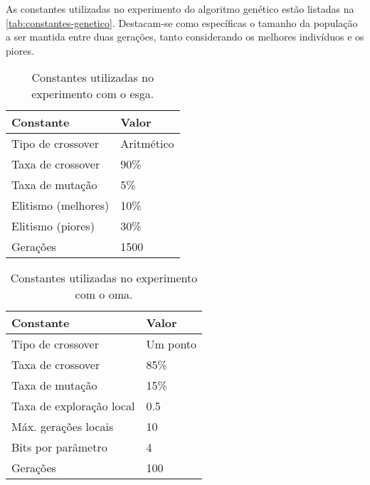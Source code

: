 As constantes utilizadas no experimento do algoritmo genético estão listadas na \autoref{tab:constantes-genetico}.
Destacam-se como específicas o tamanho da população a ser mantida entre duas gerações, tanto considerando os melhores indivíduos e os piores.

\begin{table}[htb]
    \center%
    \begin{tabular}{l l}
        \bottomrule
        \textbf{Constante}  & \textbf{Valor} \\ \midrule
        Tipo de crossover   & Aritmético     \\ \midrule
        Taxa de crossover   & 90\%           \\ \midrule
        Taxa de mutação     & 5\%            \\ \midrule
        Elitismo (melhores) & 10\%           \\ \midrule
        Elitismo (piores)   & 30\%           \\ \midrule
        Gerações            & 1500           \\ \toprule
    \end{tabular}
    \caption{Constantes utilizadas no experimento com o \gls{esga}.}%
    \label{tab:constantes-genetico}
\end{table}

\begin{table}[htb]
    \center%
    \begin{tabular}{l l}
        \bottomrule
        \textbf{Constante}       & \textbf{Valor} \\ \midrule
        Tipo de crossover        & Um ponto       \\ \midrule
        Taxa de crossover        & 85\%           \\ \midrule
        Taxa de mutação          & 15\%           \\ \midrule
        Taxa de exploração local & 0.5            \\ \midrule
        Máx. gerações locais     & 10             \\ \midrule
        Bits por parâmetro       & 4              \\ \midrule
        Gerações                 & 100            \\ \toprule
    \end{tabular}
    \caption{Constantes utilizadas no experimento com o \gls{oma}.}%
    \label{tab:constantes-memetico}
\end{table}

